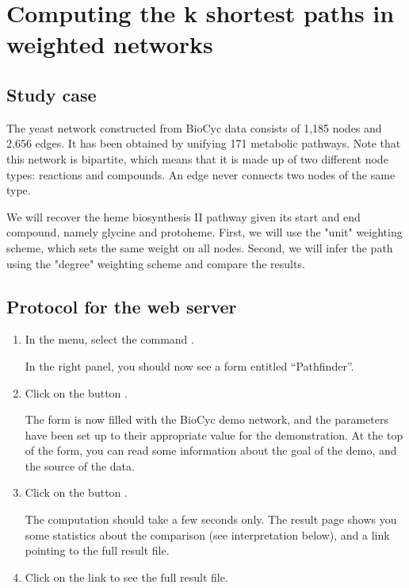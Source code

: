 \section{Computing the k shortest paths in weighted networks}

\subsection{Study case}

The yeast network constructed from BioCyc data consists of 1,185 nodes and 2,656 edges.
It has been obtained by unifying 171 metabolic pathways. Note that this network is bipartite, which means that it is made up of
two different node types: reactions and compounds. An edge never connects two nodes of the same type.

We will recover the heme biosynthesis II pathway given its start and end compound, namely glycine and protoheme. First, we will
use the "unit" weighting scheme, which sets the same weight on all nodes. Second, we will infer the path using the "degree"
weighting scheme and compare the results.

\subsection{Protocol for the web server}

\begin{enumerate}

\item In the \neat menu, select the command .

  In the right panel, you should now see a form entitled
  ``Pathfinder''.

\item Click on the button .

  The form is now filled with the BioCyc demo network, and the parameters have been
  set up to their appropriate value for the demonstration. At the top
  of the form, you can read some information about the goal of the
  demo, and the source of the data.

\item Click on the button .

  The computation should take a few seconds only. The result page
  shows you some statistics about the comparison (see interpretation
  below), and a link pointing to the full result file.

\item Click on the link to see the full result file.


\end{enumerate}



